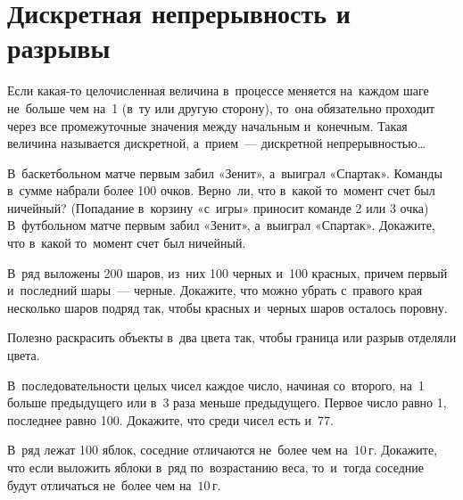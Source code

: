 
\section*{Дискретная непрерывность и разрывы}



Если какая-то целочисленная величина в~процессе меняется на~каждом шаге
не~больше чем на~1 (в~ту или другую сторону), то~она обязательно проходит через
все промежуточные значения между начальным и~конечным.
Такая величина называется дискретной, а~прием~—
дискретной непрерывностью\ldots

\begin{problems}

\item
\subproblem
В~баскетбольном матче первым забил «Зенит», а~выиграл «Спартак».
Команды в~сумме набрали более 100 очков.
Верно~ли, что в~какой то~момент счет был ничейный?
(Попадание в~корзину «с~игры» приносит команде 2 или 3 очка)
\\
\subproblem
В~футбольном матче первым забил «Зенит», а~выиграл «Спартак».
Докажите, что в~какой то~момент счет был ничейный.

\item
В~ряд выложены 200 шаров, из~них 100 черных и~100 красных, причем первый
и~последний шары~— черные.
Докажите, что можно убрать с~правого края несколько шаров подряд так, чтобы
красных и~черных шаров осталось поровну.

\end{problems}

Полезно раскрасить объекты в~два цвета так, чтобы граница или разрыв отделяли
цвета.

\begin{problems}

\item
В~последовательности целых чисел каждое число, начиная со~второго, на~1 больше
предыдущего или в~3 раза меньше предыдущего.
Первое число равно 1, последнее равно 100.
Докажите, что среди чисел есть и~77.


\item
В~ряд лежат 100 яблок, соседние отличаются не~более чем на~$10\,\text{г}$.
Докажите, что если выложить яблоки в~ряд по~возрастанию веса, то~и~тогда
соседние будут отличаться не~более чем на~$10\,\text{г}$.

\end{problems}

